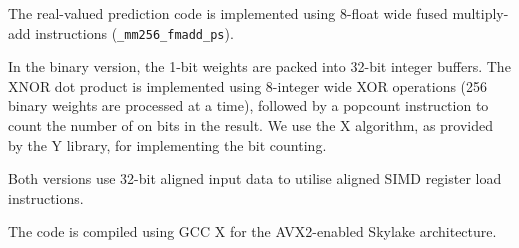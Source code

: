 \documentclass[sigconf]{acmart}
\begin{document}
The real-valued prediction code is implemented using 8-float wide fused multiply-add instructions (\texttt{\_mm256\_fmadd\_ps}).

In the binary version, the 1-bit weights are packed into 32-bit integer buffers. The XNOR dot product is implemented using 8-integer wide XOR operations (256 binary weights are processed at a time), followed by a popcount instruction to count the number of on bits in the result. We use the X algorithm, as provided by the Y library, for implementing the bit counting. 

Both versions use 32-bit aligned input data to utilise aligned SIMD register load instructions. 

The code is compiled using GCC X for the AVX2-enabled Skylake architecture. 


%
%
\end{document}
